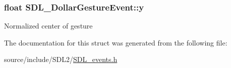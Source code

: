\subsubsection[{y}]{\setlength{\rightskip}{0pt plus 5cm}float S\+D\+L\+\_\+\+Dollar\+Gesture\+Event\+::y}\label{struct_s_d_l___dollar_gesture_event_a293b2303acc1cfc63c167c5525e6eab5}
Normalized center of gesture 

The documentation for this struct was generated from the following file\+:\begin{DoxyCompactItemize}
\item 
source/include/\+S\+D\+L2/\hyperlink{_s_d_l__events_8h}{S\+D\+L\+\_\+events.\+h}\end{DoxyCompactItemize}
